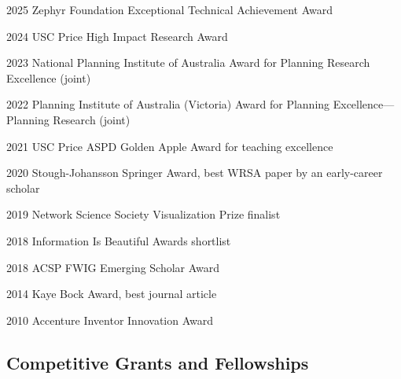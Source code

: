 \documentclass[11pt,letterpaper]{report} %
\begin{document}
    \begin{tablist}

        \item[2025] \tab{}Zephyr Foundation Exceptional Technical Achievement Award
        \item[2024] \tab{}USC Price High Impact Research Award
        \item[2023] \tab{}National Planning Institute of Australia Award for Planning Research Excellence (joint)
        \item[2022] \tab{}Planning Institute of Australia (Victoria) Award for Planning Excellence---Planning Research (joint)
        \item[2021] \tab{}USC Price ASPD Golden Apple Award for teaching excellence
        \item[2020] \tab{}Stough-Johansson Springer Award, best WRSA paper by an early-career scholar
        \item[2019] \tab{}Network Science Society Visualization Prize finalist
        \item[2018] \tab{}Information Is Beautiful Awards shortlist
        \item[2018] \tab{}ACSP FWIG Emerging Scholar Award
        \item[2014] \tab{}Kaye Bock Award, best journal article
        \item[2010] \tab{}Accenture Inventor Innovation Award

    \end{tablist}

    \subsection*{Competitive Grants and Fellowships}
\end{document}
